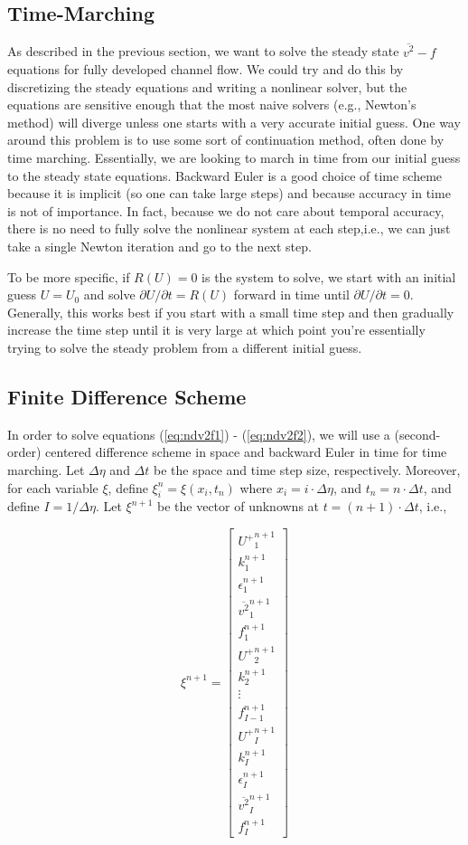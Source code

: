 \documentclass[12pt]{article}
\newcommand{\ep}{\epsilon} \newcommand{\noi}{\noindent}
\newcommand{\pr}{\partial}
\begin{document}
\subsection{Time-Marching} 

As described in the previous section, we want to solve the steady state
$\overline{v^2}-f$ equations for fully developed channel flow. We could try and
do this by discretizing the steady equations and writing a nonlinear solver, but
the equations are sensitive enough that the most naive solvers (e.g., Newton's
method) will diverge unless one starts with a very accurate initial guess. One
way around this problem is to use some sort of continuation method, often done
by time marching. Essentially, we are looking to march in time from our initial
guess to the steady state equations. Backward Euler is a good choice of time
scheme because it is implicit (so one can take large steps) and because accuracy
in time is not of importance. In fact, because we do not care about temporal
accuracy, there is no need to fully solve the nonlinear system at each
step,i.e., we can just take a single Newton iteration and go to the next step.
\cite{todd}

To be more specific, if $R(U)=0$ is the system to solve, we start with an
initial guess $U = U_0$ and solve $\pr U / \pr t = R(U)$ forward in time
until $\pr U/\pr t = 0$. Generally, this works best if you start with a small
time step and then gradually increase the time step until it is very large at
which point you're essentially trying to solve the steady problem from a
different initial guess. \cite{todd} 

\subsection{Finite Difference Scheme}

In order to solve equations (\ref{eq:ndv2f1}) - (\ref{eq:ndv2f2}), we will use a
(second-order) centered difference scheme in space and backward Euler in time
for time marching. Let $\Delta \eta$ and $\Delta t$ be the space and time step
size, respectively. Moreover, for each variable $\xi$, define $\xi_i^n = \xi(x_i,t_n)$ where $x_i = i
\cdot\Delta \eta$, and $t_n = n\cdot\Delta t$, and define $I = 1/\Delta \eta$.
Let $\xi^{n+1}$ be the vector of unknowns at $t = (n+1) \cdot \Delta t$, i.e., 

\[ \xi^{n+1} = \left[ \begin{matrix}
		{U^+}_1^{n+1} \\ k_1^{n+1} \\ \ep_1^{n+1} \\
	{\overline{v^2}}_1^{n+1} \\ f_{1}^{n+1} \\ {U^+}_2^{n+1} \\
	k_2^{n+1} \\ \vdots \\ f_{I-1}^{n+1} \\ {U^+}_I^{n+1} \\ k_I^{n+1} \\ \ep_I^{n+1} \\
{\overline{v^2}}_I^{n+1} \\ f_I^{n+1} \end{matrix} \right] \]  
\end{document}
